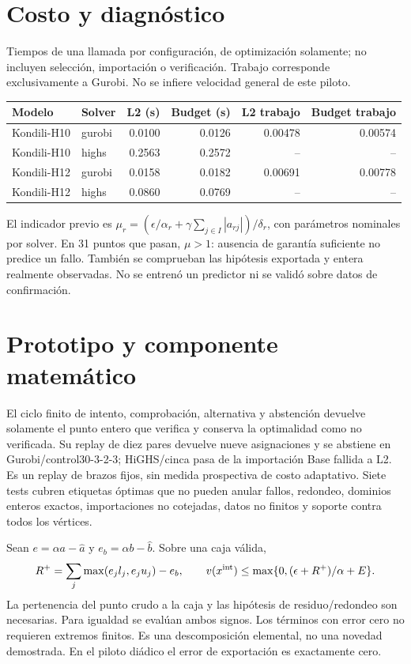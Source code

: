 \documentclass[11pt]{article}
\begin{document}
\section{Costo y diagnóstico}
Tiempos de una llamada por configuración, de optimización solamente; no incluyen
selección, importación o verificación. Trabajo corresponde exclusivamente a Gurobi.
No se infiere velocidad general de este piloto.
\begin{center}\small
\begin{tabular}{llrrrr}\toprule
Modelo & Solver & L2 (s) & Budget (s) & L2 trabajo & Budget trabajo\\\midrule
Kondili-H10 & gurobi & 0.0100 & 0.0126 & 0.00478 & 0.00574\\
Kondili-H10 & highs & 0.2563 & 0.2572 & -- & --\\
Kondili-H12 & gurobi & 0.0158 & 0.0182 & 0.00691 & 0.00778\\
Kondili-H12 & highs & 0.0860 & 0.0769 & -- & --\\
\bottomrule\end{tabular}\end{center}

El indicador previo es $\mu_r=(\epsilon/\alpha_r+
\gamma\sum_{j\in I}|a_{rj}|)/\delta_r$, con parámetros nominales por solver.
En 31 puntos que pasan, $\mu>1$: ausencia de garantía suficiente no predice un
fallo. También se comprueban las hipótesis exportada y entera realmente observadas.
No se entrenó un predictor ni se validó sobre datos de confirmación.

\section{Prototipo y componente matemático}
El ciclo finito de intento, comprobación, alternativa y abstención devuelve
solamente el punto entero que verifica y conserva la optimalidad como no verificada.
Su replay de diez pares devuelve nueve asignaciones y se abstiene en
Gurobi/control30-3-2-3; HiGHS/cinca pasa de la importación Base fallida a L2.
Es un replay de brazos fijos, sin medida prospectiva de costo adaptativo.
Siete tests cubren etiquetas óptimas que no pueden anular fallos, redondeo, dominios enteros exactos,
importaciones no cotejadas, datos no finitos y soporte contra todos los vértices.

Sean $e=\alpha a-\widehat a$ y $e_b=\alpha b-\widehat b$. Sobre una caja válida,
\[
 R^+=\sum_j\max(e_jl_j,e_ju_j)-e_b,\qquad
 v(x^{\rm int})\le\max\{0,(\epsilon+R^+)/\alpha+E\}.
\]
La pertenencia del punto crudo a la caja y las hipótesis de residuo/redondeo son
necesarias. Para igualdad se evalúan ambos signos. Los términos con error cero
no requieren extremos finitos. Es una descomposición elemental, no una novedad
demostrada. En el piloto diádico el error de exportación es exactamente cero.
\end{document}
